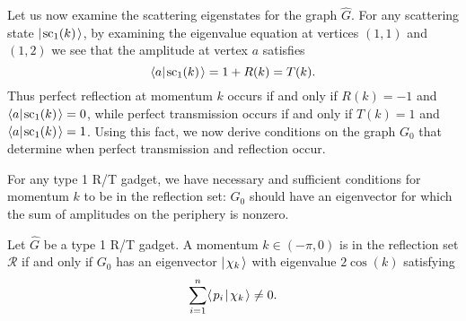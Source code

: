 \documentclass[../thesis-main/thesis-main]{subfiles}
\begin{document}
Let us now examine the scattering eigenstates for the graph $\widehat{G}$.  For any scattering state $|\mspace{2mu} \text{sc}_{1} (k) \mspace{2mu} \rangle$, by examining the eigenvalue equation at vertices $(1,1)$ and $(1,2)$ we see that the amplitude at vertex $a$ satisfies
\begin{equation}
  \langle{a}|\mspace{2mu} \text{sc}_{1} (k) \mspace{2mu} \rangle = 1 + R(k) = T(k).
\end{equation}
Thus perfect reflection at momentum $k$ occurs if and only if $R(k)=-1$ and $\langle{a}|\mspace{2mu} \text{sc}_{1} (k) \mspace{2mu} \rangle=0$, while perfect transmission occurs if and only if $T(k)=1$ and $\langle{a}|\mspace{2mu} \text{sc}_{1} (k) \mspace{2mu} \rangle=1$. Using this fact, we now derive conditions on the graph $G_0$ that determine when perfect transmission and reflection occur.

For any type 1 R/T gadget, we have necessary and sufficient conditions for momentum $k$ to be in the reflection set: $G_0$ should have an eigenvector for which the sum of amplitudes on the periphery is nonzero.
\begin{lemma}
Let $\widehat{G}$ be a type 1 R/T gadget. A momentum $k\in (-\pi,0)$ is in the reflection set $\mathcal{R}$ if and only if $G_0$ has an eigenvector $|\mspace{2mu} \chi_k \mspace{2mu} \rangle$ with eigenvalue $2\cos(k)$ satisfying
\begin{equation}
  \sum_{i=1}^{n} \langle\mspace{2mu} p_i \mspace{2mu} | \mspace{2mu} \chi_k\mspace{2mu} \rangle \neq 0. \label{eq:sum_condition}
\end{equation}
\label{lem:reflect_reqs}
\end{lemma}
\end{document}
